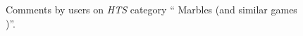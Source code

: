 
\begin{figure}[htb]
    \centering
	\caption[]{\label{fig:Stolk_thes-functionality:HTS-annotations} Comments by users on \textit{HTS} category  ``%
	Marbles (and similar games )''.}
\end{figure} 


